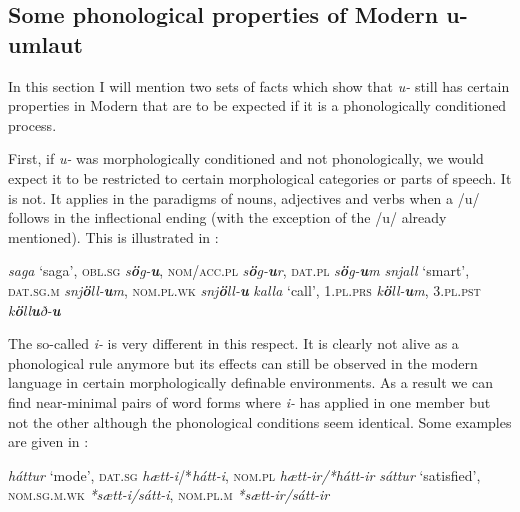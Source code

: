 \documentclass[output=paper,
modfonts
]{LSP/langsci}
\begin{document}
\subsection{Some phonological properties of Modern  {u}-umlaut}

In this section I will mention two sets of facts which show that
\emph{u-} still has certain properties in Modern  that
are to be expected if it is a phonologically conditioned process.

First, if \emph{u-} was morphologically conditioned and not
phonologically, we would expect it to be restricted to certain
morphological categories or parts of speech. It is not. It applies in
the paradigms of nouns, adjectives and verbs when a /u/ follows in the
inflectional ending (with the exception of the  /u/ already
mentioned). This is illustrated in :

\ea \label{ex:thrainsson:7}
	\ea \label{ex:thrainsson:7a}	\emph{saga} `saga', \textsc{obl.sg}
		\emph{s\textbf{ö}g-\textbf{u}}, \textsc{nom/acc.pl}
		\emph{s\textbf{ö}g-\textbf{u}r}, \textsc{dat.pl}
		\emph{s\textbf{ö}g-\textbf{u}m}
	\ex \label{ex:thrainsson:7b}	\emph{snjall} `smart', \textsc{dat.sg.m}
		\emph{snj\textbf{ö}ll-\textbf{u}m}, \textsc{nom.pl.wk}
		\emph{snj\textbf{ö}ll-\textbf{u}}
	\ex \label{ex:thrainsson:7c}	\emph{kalla} `call', \textsc{1.pl.prs}
		\emph{k\textbf{ö}ll-\textbf{u}m}, \textsc{3.pl.pst}
		\emph{k\textbf{ö}ll\textbf{u}ð-\textbf{u}}
	\z
\z

\noindent The so-called \emph{i-} is very different in this respect. It is
clearly not alive as a phonological rule anymore but its effects can
still be observed in the modern language in certain morphologically
definable environments. As a result we can find near-minimal pairs of
word forms where \emph{i-} has applied in one member but not the
other although the phonological conditions seem identical. Some examples
are given in :

\ea \label{ex:thrainsson:8}
	\ea \label{ex:thrainsson:8a} 	\emph{háttur} `mode', \textsc{dat.sg}
		\emph{hætt-i}/*\emph{hátt-i}, \textsc{nom.pl} \emph{hætt-ir/*hátt-ir}
	\ex \label{ex:thrainsson:8b}	\emph{sáttur} `satisfied', \textsc{nom.sg.m.wk}
		\emph{*sætt-i/sátt-i}, \textsc{nom.pl.m} \emph{*sætt-ir/sátt-ir}
	\z
\z
\end{document}
